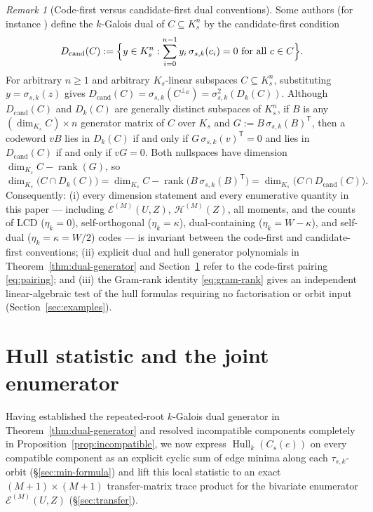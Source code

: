 \documentclass[preprint,12pt]{elsarticle}
\newcommand{\Epoly}{\mathscr E}
\newcommand{\Hpoly}{\mathscr H}
\newcommand{\Hull}{\operatorname{Hull}}
\newcommand{\rank}{\operatorname{rank}}
\newcommand{\perpE}{\perp_E}
\newcommand{\Dk}{D_k}
\numberwithin{equation}{section}
\theoremstyle{plain}
\theoremstyle{definition}
\theoremstyle{remark}
\newtheorem{remark}[theorem]{Remark}
\begin{document}
\begin{remark}[Code-first versus candidate-first dual conventions]\label{rem:conventions}
Some authors (for instance \cite{debnathConstacyclic2023,debnathAffine2026})
define the $k$-Galois dual of $C\subseteq K_s^n$ by the candidate-first condition
\[
D_{\mathrm{cand}}(C):=\Bigl\{y\in K_s^n:
 \sum_{i=0}^{n-1} y_i\,\sigma_{s,k}(c_i)=0\text{ for all }c\in C\Bigr\}.
\]
For arbitrary $n\ge 1$ and arbitrary
$K_s$-linear subspaces $C\subseteq K_s^n$, substituting $y=\sigma_{s,k}(z)$
gives $D_{\mathrm{cand}}(C)=\sigma_{s,k}(C^{\perpE})=\sigma_{s,k}^2(\Dk(C))$.
Although $D_{\mathrm{cand}}(C)$ and $\Dk(C)$ are generally distinct subspaces of
$K_s^n$, if $B$ is any $(\dim_{K_s}C)\times n$ generator matrix of $C$ over $K_s$
and $G:=B\,\sigma_{s,k}(B)^{\mathsf T}$, then a codeword $vB$ lies in $\Dk(C)$
if and only if $G\,\sigma_{s,k}(v)^{\mathsf T}=0$ and lies in
$D_{\mathrm{cand}}(C)$ if and only if $vG=0$. Both nullspaces have dimension
$\dim_{K_s}C-\rank(G)$, so
\begin{equation}\label{eq:gram-rank}
\dim_{K_s}\bigl(C\cap\Dk(C)\bigr)
 =\dim_{K_s}C-\rank\bigl(B\,\sigma_{s,k}(B)^{\mathsf T}\bigr)
 =\dim_{K_s}\bigl(C\cap D_{\mathrm{cand}}(C)\bigr).
\end{equation}
Consequently: \textup{(i)} every dimension statement and every enumerative
quantity in this paper — including $\Epoly^{(M)}(U,Z)$, $\Hpoly^{(M)}(Z)$, all
moments, and the counts of LCD ($\eta_k=0$), self-orthogonal ($\eta_k=\kappa$),
dual-containing ($\eta_k=W-\kappa$), and self-dual ($\eta_k=\kappa=W/2$) codes —
is invariant between the code-first and candidate-first conventions;
\textup{(ii)} explicit dual and hull generator polynomials in
Theorem~\ref{thm:dual-generator} and Section~\ref{sec:enumerator} refer to the
code-first pairing \eqref{eq:pairing}; and \textup{(iii)} the Gram-rank identity
\eqref{eq:gram-rank} gives an independent linear-algebraic test of the hull
formulas requiring no factorisation or orbit input (Section~\ref{sec:examples}).
\end{remark}

\section{Hull statistic and the joint enumerator}\label{sec:enumerator}

Having established the repeated-root $k$-Galois dual generator in
Theorem~\ref{thm:dual-generator} and resolved incompatible components completely
in Proposition~\ref{prop:incompatible}, we now express $\Hull_k(C_s(e))$ on every
compatible component as an explicit cyclic sum of edge minima along each
$\tau_{s,k}$-orbit (\S\ref{sec:min-formula}) and lift this local statistic to an
exact $(M+1)\times(M+1)$ transfer-matrix trace product for the bivariate
enumerator $\Epoly^{(M)}(U,Z)$ (\S\ref{sec:transfer}).
\end{document}
